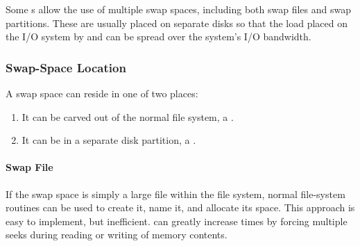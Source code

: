 Some s allow the use of multiple swap spaces, including both swap files and swap partitions.
These are usually placed on separate disks so that the load placed on the I/O system by  and  can be spread over the system’s I/O bandwidth.

\subsubsection{Swap-Space Location}\label{subsubsec:Swap_Space_Location}
A swap space can reside in one of two places:
\begin{enumerate}[noitemsep]
\item It can be carved out of the normal file system, a .
\item It can be in a separate disk partition, a .
\end{enumerate}

\paragraph{Swap File}\label{par:Swap_File}
If the swap space is simply a large file within the file system, normal file-system routines can be used to create it, name it, and allocate its space.
This approach is easy to implement, but inefficient.
 can greatly increase  times by forcing multiple seeks during reading or writing of memory contents.


